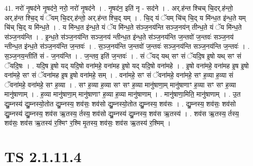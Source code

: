 \documentclass[17pt]{extarticle}
\begin{document}
41. नरो॑ नृ॒षद॑ने नृ॒षद॑ने॒ नरो॒ नरो॑ नृ॒षद॑ने । . नृ॒षद॑न॒ इति॑ नृ - सद॑ने । . अर्.ह॑न्त श्चिच् चि॒दर्.ह॑न्तो॒ अर्.ह॑न्त श्चि॒द् यं ॅयम् चि॒दर्.ह॑न्तो॒ अर्.ह॑न्त श्चि॒द् यम् । . चि॒द् यं ॅयम् चि॑च् चि॒द् य मि॑न्ध॒त इ॑न्ध॒ते यम् चि॑च् चि॒द् य मि॑न्ध॒ते । . य मि॑न्ध॒त इ॑न्ध॒ते यं ॅय मि॑न्ध॒ते स॑ञ्ज॒नय॑न्ति सञ्ज॒नय॑न् तीन्ध॒ते यं ॅय मि॑न्ध॒ते स॑ञ्ज॒नय॑न्ति । . इ॒न्ध॒ते स॑ञ्ज॒नय॑न्ति सञ्ज॒नय॑ न्तीन्ध॒त इ॑न्ध॒ते स॑ञ्ज॒नय॑न्ति ज॒न्तवो॑ ज॒न्तवः॑ सञ्ज॒नय॑ न्तीन्ध॒त इ॑न्ध॒ते स॑ञ्ज॒नय॑न्ति ज॒न्तवः॑ । . स॒ञ्ज॒नय॑न्ति ज॒न्तवो॑ ज॒न्तवः॑ सञ्ज॒नय॑न्ति सञ्ज॒नय॑न्ति ज॒न्तवः॑ । . स॒ञ्ज॒नय॒न्तीति॑ सं - ज॒नय॑न्ति । . ज॒न्तव॒ इति॑ ज॒न्तवः॑ । . सं ॅयद् यथ् सꣳ सं ॅयदि॒ष इ॒षो यथ् सꣳ सं ॅयदि॒षः । . यदि॒ष इ॒षो यद् यदि॒षो वना॑महे॒ वना॑मह इ॒षो यद् यदि॒षो वना॑महे । . इ॒षो वना॑महे॒ वना॑मह इ॒ष इ॒षो वना॑महे॒ सꣳ सं ॅवना॑मह इ॒ष इ॒षो वना॑महे॒ सम् । . वना॑महे॒ सꣳ सं ॅवना॑महे॒ वना॑महे॒ सꣳ ह॒व्या ह॒व्या सं ॅवना॑महे॒ वना॑महे॒ सꣳ ह॒व्या । . सꣳ ह॒व्या ह॒व्या सꣳ सꣳ ह॒व्या मानु॑षाणा॒म् मानु॑षाणाꣳ ह॒व्या सꣳ सꣳ ह॒व्या मानु॑षाणाम् । . ह॒व्या मानु॑षाणा॒म् मानु॑षाणाꣳ ह॒व्या ह॒व्या मानु॑षाणाम् । . मानु॑षाणा॒मिति॒ मानु॑षाणाम् । . उ॒त द्यु॒म्नस्य॑ द्यु॒म्नस्यो॒तोत द्यु॒म्नस्य॒ शव॑सः॒ शव॑सो द्यु॒म्नस्यो॒तोत द्यु॒म्नस्य॒ शव॑सः । . द्यु॒म्नस्य॒ शव॑सः॒ शव॑सो द्यु॒म्नस्य॑ द्यु॒म्नस्य॒ शव॑स ऋ॒तस्य॒ र्तस्य॒ शव॑सो द्यु॒म्नस्य॑ द्यु॒म्नस्य॒ शव॑स ऋ॒तस्य॑ । . शव॑स ऋ॒तस्य॒ र्तस्य॒ शव॑सः॒ शव॑स ऋ॒तस्य॑ र॒श्मिꣳ र॒श्मि मृ॒तस्य॒ शव॑सः॒ शव॑स ऋ॒तस्य॑ र॒श्मिम् । \newline
\pagebreak
{}
\section*{ TS 2.1.11.4 }
\end{document}
